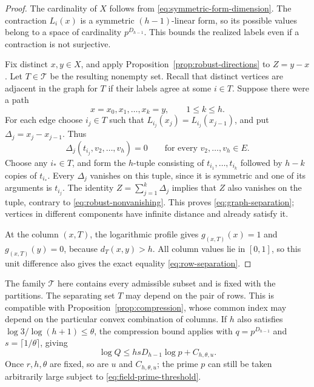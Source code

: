 \begin{proof}
The cardinality of $X$ follows from
\eqref{eq:symmetric-form-dimension}.  The contraction $L_i(x)$ is a
symmetric $(h-1)$-linear form, so its possible values belong to a space
of cardinality $p^{D_{h-1}}$.  This bounds the realized labels even if a
contraction is not surjective.

Fix distinct $x,y\in X$, and apply
Proposition~\ref{prop:robust-directions} to $Z=y-x$.  Let $T\in\mathcal T$
be the resulting nonempty set.  Recall that distinct vertices are
adjacent in the graph for $T$ if their labels agree at some $i\in T$.
Suppose there were a path
\[
  x=x_0,x_1,\ldots,x_k=y,\qquad 1\le k\le h.
\]
For each edge choose $i_j\in T$ such that
$L_{i_j}(x_j)=L_{i_j}(x_{j-1})$, and put
$\Delta_j=x_j-x_{j-1}$.  Thus
\[
  \Delta_j(t_{i_j},v_2,\ldots,v_h)=0
  \qquad\text{for every }v_2,\ldots,v_h\in E.
\]
Choose any $i_*\in T$, and form the $h$-tuple consisting of
$t_{i_1},\ldots,t_{i_k}$ followed by $h-k$ copies of $t_{i_*}$.
Every $\Delta_j$ vanishes on this tuple, since it is symmetric and one
of its arguments is $t_{i_j}$.  The identity
$Z=\sum_{j=1}^k\Delta_j$ implies that $Z$ also vanishes on the tuple,
contrary to \eqref{eq:robust-nonvanishing}.  This proves
\eqref{eq:graph-separation}; vertices in different components have
infinite distance and already satisfy it.

At the column $(x,T)$, the logarithmic profile gives
$g_{(x,T)}(x)=1$ and $g_{(x,T)}(y)=0$, because $d_T(x,y)>h$.
All column values lie in $[0,1]$, so this unit difference also gives
the exact equality \eqref{eq:row-separation}.
\end{proof}

The family $\mathcal T$ here contains every admissible subset and is
fixed with the partitions.  The separating set $T$ may depend on the
pair of rows.  This is compatible with Proposition~\ref{prop:compression},
whose common index may depend on the particular convex combination of
columns.  If $h$ also satisfies $\log3/\log(h+1)\le\theta$, the
compression bound applies with $q=p^{D_{h-1}}$ and $s=\lceil1/\theta\rceil$,
giving
\begin{equation}
  \log Q\le hsD_{h-1}\log p+C_{h,\theta,u}.
  \label{eq:field-compression-bound}
\end{equation}
Once $r,h,\theta$ are fixed, so are $u$ and $C_{h,\theta,u}$; the prime
$p$ can still be taken arbitrarily
large subject to \eqref{eq:field-prime-threshold}.
